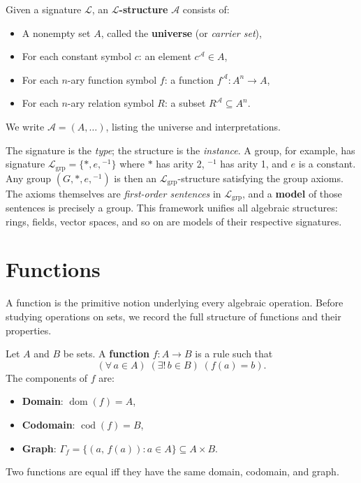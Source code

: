 \begin{definition}
  Given a signature $\mathcal{L}$, an \textbf{$\mathcal{L}$-structure}
  $\mathcal{A}$ consists of:
  \begin{itemize}
    \item A nonempty set $A$, called the \textbf{universe} (or
          \emph{carrier set}),
    \item For each constant symbol $c$: an element $c^{\mathcal{A}} \in A$,
    \item For each $n$-ary function symbol $f$: a function
          $f^{\mathcal{A}} : A^n \to A$,
    \item For each $n$-ary relation symbol $R$: a subset
          $R^{\mathcal{A}} \subseteq A^n$.
  \end{itemize}
  We write $\mathcal{A} = (A, \ldots)$, listing the universe and
  interpretations.
\end{definition}

\begin{remark}
  The signature is the \emph{type}; the structure is the \emph{instance}.
  A group, for example, has signature
  $\mathcal{L}_{\mathrm{grp}} = \{*, e, {}^{-1}\}$
  where $*$ has arity 2, ${}^{-1}$ has arity 1, and $e$ is a constant.
  Any group $(G, *, e, {}^{-1})$ is then an $\mathcal{L}_{\mathrm{grp}}$-structure
  satisfying the group axioms.  The axioms themselves are
  \emph{first-order sentences} in $\mathcal{L}_{\mathrm{grp}}$, and a
  \textbf{model} of those sentences is precisely a group.
  This framework unifies all algebraic structures: rings, fields, vector
  spaces, and so on are models of their respective signatures.
\end{remark}

\medskip

\section*{Functions}

\noindent
A function is the primitive notion underlying every algebraic operation.
Before studying operations on sets, we record the full structure of
functions and their properties.

\begin{definition}[Function]
  Let $A$ and $B$ be sets. A \textbf{function} $f : A \to B$ is a rule
  such that
  \[
    (\forall\, a \in A)\;(\exists!\, b \in B)\;(f(a) = b).
  \]
  The components of $f$ are:
  \begin{itemize}
    \item \textbf{Domain}: $\operatorname{dom}(f) = A$,
    \item \textbf{Codomain}: $\operatorname{cod}(f) = B$,
    \item \textbf{Graph}: $\Gamma_f = \{(a,\, f(a)) : a \in A\}
          \subseteq A \times B$.
  \end{itemize}
  Two functions are equal iff they have the same domain, codomain, and graph.
\end{definition}


